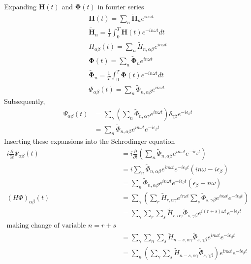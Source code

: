 Expanding $\mathbf{H}(t)$ and $\bm{\Phi}(t)$ in fourier series
\begin{gather}
 \mathbf{H}(t) = \sum_{n}{\tilde{\mathbf{H}}_{n} e^{in\omega t}} \\
 \tilde{\mathbf{H}}_{n} = \frac{1}{T}\int_{0}^{T}{\mathbf{H}(t)e^{-in\omega t} dt} \\
 H_{\alpha\beta}(t) = \sum_{n}{\tilde{H}_{n,\alpha\beta} e^{in\omega t}} \\
 \bm{\Phi}(t) = \sum_{n}{\tilde{\bm{\Phi}}_{n} e^{in\omega t}} \\ 
 \tilde{\bm{\Phi}}_{n} = \frac{1}{T}\int_{0}^{T}{\bm{\Phi}(t)e^{-in\omega t} dt} \\
 \Phi_{\alpha\beta}(t) = \sum_{n}{\tilde{\Phi}_{n,\alpha\beta} e^{in\omega t}}
\end{gather}
Subsequently,
\begin{align}
 \Psi_{\alpha\beta}(t) &= \sum_{\gamma}{\left(\sum_{n}{\tilde{\Phi}_{n,\alpha\gamma} e^{in\omega t}}\right)\delta_{\gamma\beta}e^{-i\epsilon_\beta t}} \nonumber \\
 &= \sum_{n}{\tilde{\Phi}_{n,\alpha\beta}e^{in\omega t}e^{-i\epsilon_\beta t}}
\end{align}
Inserting these expansions into the Schrodinger equation
\begin{align*}
 i\frac{\partial}{\partial t}\Psi_{\alpha\beta}(t) &= i\frac{\partial}{\partial t}\left(\sum_{n}{\tilde{\Phi}_{n,\alpha\beta}e^{in\omega t}e^{-i\epsilon_\beta t}}\right) \\
 &= i\sum_{n}{\tilde{\Phi}_{n,\alpha\beta}e^{in\omega t}e^{-i\epsilon_\beta t} (in\omega - i\epsilon_\beta)} \\
 &= \sum_{n}{\tilde{\Phi}_{n,\alpha\beta}e^{in\omega t}e^{-i\epsilon_\beta t} (\epsilon_\beta-n\omega)} \\ 
 (H\Phi)_{\alpha\beta}(t) &= \sum_{\gamma}{\left(\sum_{r}{\tilde{H}_{r,\alpha\gamma} e^{ir\omega t}}\sum_{s}{\tilde{\Phi}_{s,\gamma\beta} e^{is\omega t}e^{-i\epsilon_\beta t}}\right)} \\
 &= \sum_{\gamma}{\sum_{r}{\sum_{s}{\tilde{H}_{r,\alpha\gamma}\tilde{\Phi}_{s,\gamma\beta}e^{i(r+s)\omega t}e^{-i\epsilon_\beta t}}}}\\
 \text{making change of variable } n = r+s \\
 &= \sum_{\gamma}{\sum_{n}{\sum_{s}{\tilde{H}_{n-s,\alpha\gamma}\tilde{\Phi}_{s,\gamma\beta}e^{in\omega t}e^{-i\epsilon_\beta t}}}} \\
 &= \sum_{n}{\left(\sum_{\gamma}{\sum_{s}{\tilde{H}_{n-s,\alpha\gamma}\tilde{\Phi}_{s,\gamma\beta}}}\right)e^{in\omega t}e^{-i\epsilon_\beta t}}
\end{align*}
